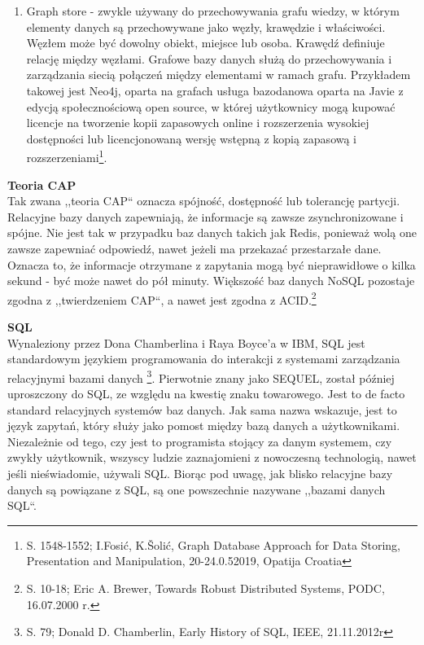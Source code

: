 \documentclass[12pt, a4paper, twoside, openany]{book}
\begin{document}
\begin{enumerate}[label=--]
    Jest ona wykorzystywana w różnych przypadkach, takich jak serwisy społecznościowe i analiza danych w czasie rzeczywistym\footnote{S. 118-122; K. T. Sridhar, Modern Column Stores for Big Data Processing, XtremeData Technologies, Bangalore, India, 25.11.2017 r.}.
    \item Graph store - zwykle używany do przechowywania grafu wiedzy, w którym elementy danych są przechowywane jako węzły, krawędzie i właściwości.
    Węzłem może być dowolny obiekt, miejsce lub osoba.
    Krawędź definiuje relację między węzłami.
    Grafowe bazy danych służą do przechowywania i zarządzania siecią połączeń między elementami w ramach grafu.
    Przykładem takowej jest Neo4j, oparta na grafach usługa bazodanowa oparta na Javie z edycją społecznościową open source, w której użytkownicy mogą kupować licencje na tworzenie kopii zapasowych online i rozszerzenia wysokiej dostępności lub licencjonowaną wersję wstępną z kopią zapasową i rozszerzeniami\footnote{S. 1548-1552; I.Fosić, K.Šolić, Graph Database Approach for Data Storing, Presentation and Manipulation, 20-24.0.52019, Opatija Croatia}.
\end{enumerate}

\textbf{Teoria CAP} \\
Tak zwana ,,teoria CAP`` oznacza spójność, dostępność lub tolerancję partycji. Relacyjne bazy danych zapewniają, że informacje są zawsze zsynchronizowane i spójne. Nie jest tak w przypadku baz danych takich jak Redis, ponieważ wolą one zawsze zapewniać odpowiedź, nawet jeżeli ma przekazać przestarzałe dane. Oznacza to, że informacje otrzymane z zapytania mogą być nieprawidłowe o kilka sekund - być może nawet do pół minuty. Większość baz danych NoSQL pozostaje zgodna z ,,twierdzeniem CAP``, a nawet jest zgodna z ACID.\footnote{S. 10-18; Eric A. Brewer, Towards Robust Distributed Systems, PODC, 16.07.2000 r.}

\textbf{SQL\\}
Wynaleziony przez Dona Chamberlina i Raya Boyce'a w IBM, SQL jest standardowym językiem programowania do interakcji z systemami zarządzania relacyjnymi bazami danych \footnote{S. 79; Donald D. Chamberlin, Early History of SQL, IEEE, 21.11.2012r}.
Pierwotnie znany jako SEQUEL, został później uproszczony do SQL, ze względu na kwestię znaku towarowego.
Jest to de facto standard relacyjnych systemów baz danych.
Jak sama nazwa wskazuje, jest to język zapytań, który służy jako pomost między bazą danych a użytkownikami.
Niezależnie od tego, czy jest to programista stojący za danym systemem, czy zwykły użytkownik, wszyscy ludzie zaznajomieni z nowoczesną technologią, nawet jeśli nieświadomie, używali SQL.
Biorąc pod uwagę, jak blisko relacyjne bazy danych są powiązane z SQL, są one powszechnie nazywane ,,bazami danych SQL``.
\end{document}
